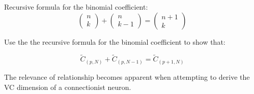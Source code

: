 \begin{frame}
Recursive formula for the binomial coefficient:
\begin{equation}
			\left( \begin{array}{c}
			n\\
			k
			\end{array}\right)+
			\left( \begin{array}{c}
			n\\
			k-1
			\end{array}\right)=
			\left( \begin{array}{c}
			n+1\\
			k
			\end{array}\right)
\end{equation}

Use the the recursive formula for the binomial coefficient to show that:

\begin{equation}
\tilde C_{(p,N)}+\tilde C_{(p,N-1)}=\tilde C_{(p+1,N)}
\label{eq:c_relation}
\end{equation}

The relevance of \notesonly{\eqref{eq:c_relation}} relationship becomes apparent when attempting to derive the VC dimension  of a connectionist neuron.

\end{frame}


